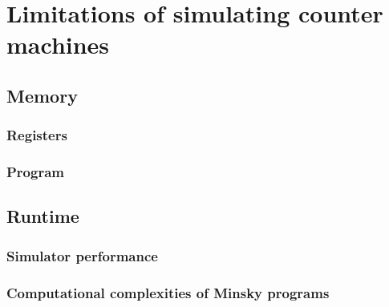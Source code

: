 \chapter{Limitations of simulating counter machines}
\section{Memory}
\subsection{Registers}
\subsection{Program}
\section{Runtime}
\subsection{Simulator performance}
\subsection{Computational complexities of Minsky programs}
